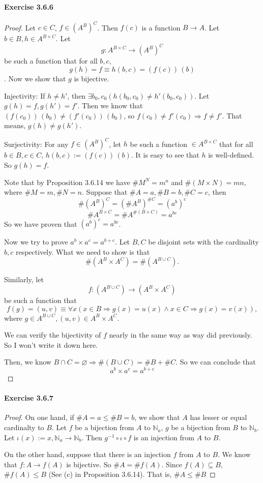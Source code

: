 \paragraph{Exercise 3.6.6} \label{exercise3.6.6}
\begin{proof}
Let $c \in C$, $f \in (A^B)^C$. Then $f(c)$ is a function $B\rightarrow A$. Let 
$b \in B, h \in A^{B\times C}$. Let
\[
g:A^{B\times C} \rightarrow (A^B)^{C}
\]
be such a function that for all $b,c$,
\[
g(h) = f \equiv h(b,c) = (f(c))\,(b)
\]
. Now we show that $g$ is bijective.

Injectivity: 
If $h \neq h'$, then $\exists b_0,c_0(h(b_0,c_0) \neq h'(b_0,c_0))$. Let $g(h) =f, g(h') = f'$. Then we 
know that $(f(c_0))\,(b_0) \neq (f'(c_0))\,(b_0)$, so $f(c_0) \neq f'(c_0) \Longrightarrow f \neq f'$. 
That means, $g(h) \neq g(h')$.

Surjectivity:
For any $f \in (A^B)^{C}$, let $h$ be such a function $\in A^{B\times C}$ that for all $b \in B,c \in C$, 
$h(b,c) := (f(c))\,(b)$. It is easy to see that $h$ is well-defined. So $g(h) = f$.

Note that by Proposition 3.6.14 we have $\#M^N = m^n$ and $\#(M \times N) = mn$, where $\#M =m, \#N =n$. 
Suppose that $\#A = a, \#B = b, \#C = c$, then
\[
\#(A^B)^C = (\#A^B)^{\#C} = (a^b)^c
\]
\[
\#A^{B\times C} = \#A^{\#(B \times C)} = a^{bc}
\]
So we have proven that $(a^b)^c = a^{bc}$.

Now we try to prove $a^b \times a^c = a^{b+c}$. Let $B,C$ be disjoint sets with the cardinality $b,c$ 
respectively. What we need to show is that
\[
\#(A^B \times A^C) = \#(A^{B \cup C}).
\]

Similarly, let 
\[
f: (A^{B \cup C}) \rightarrow (A^B \times A^C)
\]
be such a function that 
\[
f(g) = (u,v) \equiv \forall x(x \in B \Rightarrow g(x) = u(x) \wedge x \in C \Rightarrow g(x) = v(x)),
\]
where $g\in A^{B \cup C}, (u,v) \in A^B \times A^C$.

We can verify the bijectivity of $f$ nearly in the same way as way did previously. So I won't write it 
down here.

Then, we know $B \cap C = \varnothing \Rightarrow \#(B \cup C) = \#B + \#C$. So we can conclude that 
\[
a^b \times a^c = a^{b+c}
\]
\end{proof}

\paragraph{Exercise 3.6.7} \label{exercise3.6.7}
\begin{proof}
On one hand, if $\#A = a \leq \#B = b$, we show that $A$ has lesser or equal cardinalty to $B$. Let $f$ 
be a bijection from $A$ to $\mathbb{N}_{a}$, $g$ be a bijection from $B$ to $\mathbb{N}_b$. Let 
$\iota(x):=x, \mathbb{N}_{a} \rightarrow \mathbb{N}_b$. Then $g^{-1} \circ \iota \circ f$ is an injection 
from $A$ to $B$.

On the other hand, suppose that there is an injection $f$ from $A$ to $B$. We know that 
$f:A\rightarrow f(A)$ is bijective. So $\#A = \#f(A)$. Since $f(A) \subseteq B$, $\#f(A) \leq B$ (See (c) 
in Proposition 3.6.14). That is, $\#A \leq \#B$
\end{proof}

